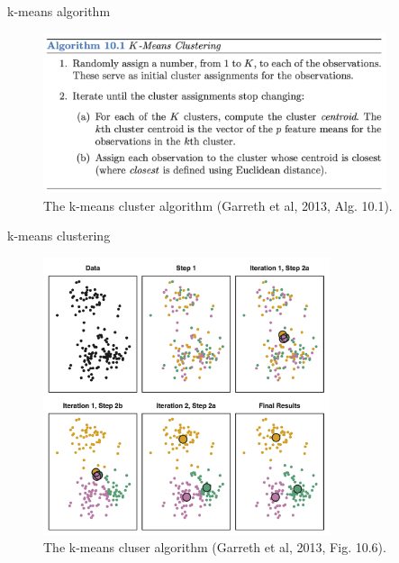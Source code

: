 \documentclass[10pt]{beamer}
\begin{document}
\begin{frame}{k-means algorithm}

\begin{figure}[h]
\centering
\includegraphics[width=0.9\textwidth]{fig/algo_10_1_kmeans.png}
\caption{The k-means cluster algorithm (Garreth et al, 2013, Alg. 10.1).}
\end{figure}


\end{frame}



\begin{frame}{k-means clustering}

\begin{figure}[h]
\centering
\includegraphics[width=0.75\textwidth]{fig/fig_10_6_kmeans_algo.png}
\caption{The k-means cluser algorithm (Garreth et al, 2013, Fig. 10.6).}
\end{figure}

\end{frame}
\end{document}
